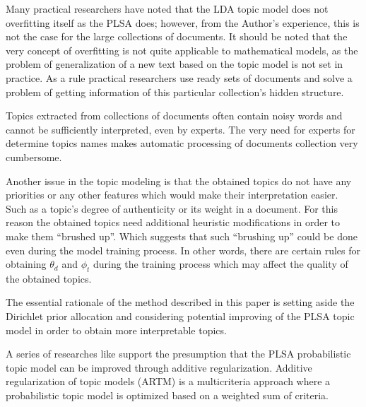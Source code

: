 \documentclass[12pt]{report}
\theoremstyle{definition}
\begin{document}
Many practical researchers have noted that the LDA topic model does not overfitting itself as the PLSA does; however, from the Author's experience, this is not the case for the large collections of documents. 
It should be noted that the very concept of overfitting is not quite applicable to mathematical models, as the problem of generalization of a new text based on the topic model is not set in practice. As a rule practical researchers use ready sets of documents and solve a problem of getting information of this particular collection's hidden structure.

Topics extracted from collections of documents often contain noisy words and cannot be sufficiently interpreted, even by experts. The very need for experts for determine topics names makes automatic processing of documents collection very cumbersome.  

Another issue in the topic modeling is that the obtained topics do not have any priorities or any other features which would make their interpretation easier. Such as a topic's degree of authenticity or its weight in a document. 
For this reason the obtained topics need additional heuristic modifications in order to make them ``brushed up''. Which suggests that such ``brushing up'' could be done even during the model training process.  In other words, there are certain rules for obtaining $\theta_d$ and $\phi_t$ during the training process which may affect the quality of the obtained topics. 

%


The essential rationale of the method described in this paper is setting aside the Dirichlet prior allocation and considering potential improving of the PLSA topic model in order to obtain more interpretable topics.

A series of researches like \cite{vorontsov2015additive, vorontsov2014additive, vorontsov2015additive2} support the presumption that the PLSA probabilistic topic model can be improved through additive regularization. Additive regularization of topic models (ARTM) is a multicriteria approach where a probabilistic topic model is optimized based on a weighted sum of criteria.
\end{document}
